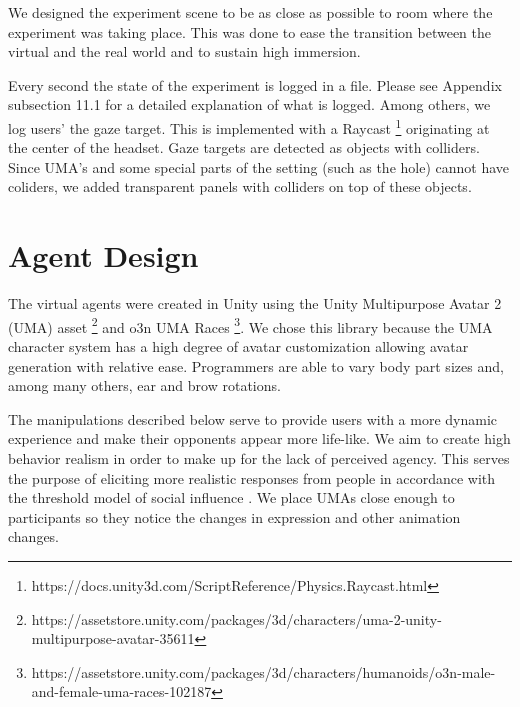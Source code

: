 We designed the experiment scene to be as close as possible to room where the experiment was taking place. This was done to ease the transition between the virtual and the real world and to sustain high immersion. 

Every second the state of the experiment is logged in a file. Please see Appendix subsection 11.1 for a detailed explanation of what is logged. Among others, we log users' the gaze target. This is implemented with a Raycast \footnote{https://docs.unity3d.com/ScriptReference/Physics.Raycast.html} originating at the center of the headset. Gaze targets are detected as objects with colliders. Since UMA's and some special parts of the setting (such as the hole) cannot have coliders, we added transparent panels with colliders on top of these objects.


\section{Agent Design}
\label{section:AgentDesign}

The virtual agents were created in Unity using the Unity Multipurpose Avatar 2 (UMA) asset \footnote{https://assetstore.unity.com/packages/3d/characters/uma-2-unity-multipurpose-avatar-35611} and o3n UMA Races \footnote{https://assetstore.unity.com/packages/3d/characters/humanoids/o3n-male-and-female-uma-races-102187}. We chose this library because the UMA character system has a high degree of avatar customization allowing avatar generation with relative ease. Programmers are able to vary body part sizes and, among many others, ear and brow rotations. 

The manipulations described below serve to provide users with a more dynamic experience and make their opponents appear more life-like. We aim to create high behavior realism in order to make up for the lack of perceived agency. This serves the purpose of eliciting more realistic responses from people in accordance with the threshold model of social influence \cite{blascovich2002theoretical}. We place UMAs close enough to participants so they notice the changes in expression and other animation changes.

